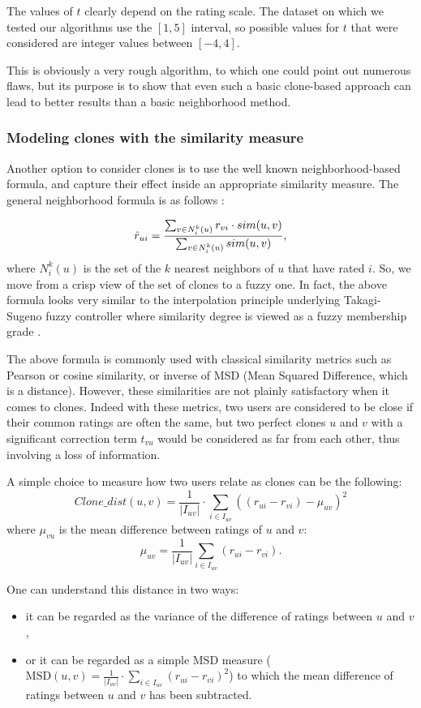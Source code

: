 The values of $t$ clearly depend on the rating scale. The dataset on which we
tested our algorithms use the $[1, 5]$ interval, so possible values for $t$
that were considered are integer values between $[-4, 4]$.

This is obviously a very rough algorithm, to which one could point out numerous
flaws, but its purpose is to show that even such a basic clone-based approach
can lead to better results than a basic neighborhood method.

\subsubsection{Modeling clones with the similarity measure}
\label{MODELING_CLONES}
Another option to consider clones is to use the well known neighborhood-based
formula, and capture their effect inside an appropriate similarity measure. The
general neighborhood formula is as follows \cite{RecoSystemHandbook}:

$$\hat{r}_{ui} = \frac{\sum_{v \in N_i^k(u)} r_{vi} \cdot sim(u, v)}{\sum_{v \in
  N_i^k(u)} sim(u, v)},$$
where $N_i^k(u)$ is the set of the $k$ nearest neighbors of $u$ that have rated
$i$. So, we move from a crisp view of the set of clones to a fuzzy one. In
fact, the above formula looks very similar to the interpolation principle
underlying Takagi-Sugeno fuzzy controller where similarity degree is viewed as
a fuzzy membership grade \cite{TakSug85}.

The above formula is commonly used with classical similarity metrics such as
Pearson or cosine similarity, or inverse of MSD (Mean Squared Difference, which is
a distance).
However, these similarities are not plainly satisfactory when it comes to
clones. Indeed with these metrics, two users are considered to be close if
their common ratings are often the same, but two perfect clones $u$ and $v$
with a significant correction term $t_{vu}$ would be considered as far from
each other, thus involving a loss of information.

A simple choice to measure how two users relate as clones can be the following:
$$Clone\_dist(u, v) =  \frac{1}{|I_{uv}|} \cdot \sum\limits_{i \in I_{uv}}
((r_{ui} - r_{vi}) - \mu_{uv})^2$$
where $\mu_{vu}$ is the mean difference between ratings of $u$ and $v$:
$$\mu_{uv}= \frac{1}{|I_{uv}|}\sum_{i \in I_{uv}} (r_{ui} - r_{vi}).$$

One can understand this distance in two ways:
\begin{itemize}
\item it can be regarded as the variance of the difference of ratings between
  $u$ and $v$,
\item or it can be regarded as a simple MSD measure ($\text{MSD}(u, v) =
  \frac{1}{|I_{uv}|} \cdot \sum\limits_{i \in I_{uv}}
  (r_{ui} - r_{vi})^2$)
 to which the mean difference of ratings between $u$ and $v$ has been
 subtracted.
  \end{itemize}

